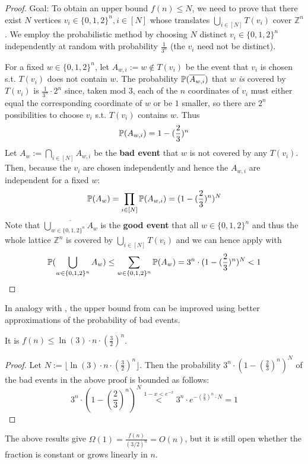 \documentclass[../main.tex]{subfiles}
\begin{document}
\begin{proof}
	Goal: To obtain an upper bound $f(n) \leq N$, we need to prove that there exist $N$ vertices $v_i \in \{0,1,2\}^n, i \in [N]$ whose translates $\bigcup_{i \in [N]} T(v_i)$ cover $\mathbb{Z}^n$. We employ the probabilistic method by choosing $N$ distinct $v_i \in \{0,1,2\}^n$ independently at random with probability $\frac{1}{3^n}$ (the $v_i$ need not be distinct).
	
	For a fixed $w \in \{0,1,2\}^n$, let 
	$A_{w,i} := w \notin T(v_i)$ be the event that $v_i$ is chosen s.t. $T(v_i)$ does not contain $w$. The probability $\mathbb{P}(\overline{A_{w,i}})$ that $w$ \textit{is} covered by $T(v_i)$ is $\frac{1}{3^n} \cdot 2^n$ since, taken mod $3$, each of the $n$ coordinates of $v_i$ must either equal the corresponding coordinate of $w$ or be $1$ smaller, so there are $2^n$ possibilities to choose $v_i$ s.t. $T(v_i)$ contains $w$. Thus
	$$\mathbb{P}(A_{w,i}) = 1-(\frac{2}{3})^n$$ 
	Let $A_w := \bigcap_{i \in [N]} A_{w,i}$ be the \textbf{bad event} that $w$ is not covered by any $T(v_i)$. Then, because the $v_i$ are chosen independently and hence the $A_{w,i}$ are independent for a fixed $w$:
	$$\mathbb{P}(A_w) = \prod_{i \in [N]} \mathbb{P}(A_{w,i}) = (1-(\frac{2}{3})^n)^N$$
	Note that $\overline{\bigcup_{w \in \{0,1,2\}^n} A_w}$ is the \textbf{good event} that all $w \in \{0,1,2\}^n$ and thus the whole lattice $\mathbb{Z}^n$ is covered by $\bigcup_{i \in [N]} T(v_i)$ and we can hence apply  with 
	$$\mathbb{P}(\bigcup_{w \in \{0,1,2\}^n} A_w) \leq \sum_{w \in \{0,1,2\}^n} \mathbb{P}(A_w) = 3^n \cdot (1-(\frac{2}{3})^n)^N < 1$$
\end{proof}

In analogy with , the upper bound from  can be improved using better approximations of the probability of bad events.

\begin{corollary}\label{cor:geometryBetterProb}
	It is $f(n) \leq \ln(3)\cdot n \cdot (\frac{3}{2})^n$.
\end{corollary}

\begin{proof}
	Let $N := \lfloor \ln(3)\cdot n \cdot (\frac{3}{2})^n \rfloor$. Then the probability $3^n \cdot (1-(\frac{2}{3})^n)^N$ of the bad events in the above proof is bounded as follows:
	$$3^n \cdot (1-(\frac{2}{3})^n)^N \overset{1-x < e^{-x}}{<} 3^n \cdot e^{-(\frac{2}{3})^n \cdot N} = 1$$
\end{proof}

\begin{remark}
The above results give $\Omega(1) = \frac{f(n)}{(3/2)^n} = O(n)$, but it is still open whether the fraction is constant or grows linearly in $n$.
\end{remark}
\end{document}
